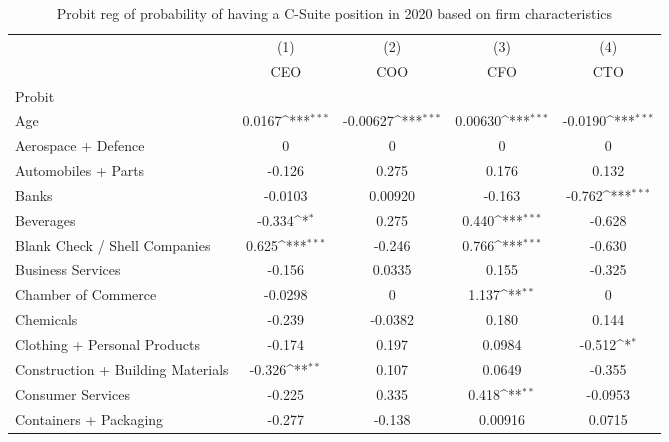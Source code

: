 {
\def\sym#1{\ifmmode^{#1}\else\(^{#1}\)\fi}
\begin{longtable}{l*{4}{c}}
\caption{Probit reg of probability of having a C-Suite position in 2020 based on firm characteristics\label{tab1}}\\
\toprule\endfirsthead\midrule\endhead\midrule\endfoot\endlastfoot
                &\multicolumn{1}{c}{(1)}&\multicolumn{1}{c}{(2)}&\multicolumn{1}{c}{(3)}&\multicolumn{1}{c}{(4)}\\
                &\multicolumn{1}{c}{CEO}&\multicolumn{1}{c}{COO}&\multicolumn{1}{c}{CFO}&\multicolumn{1}{c}{CTO}\\
\midrule
Probit          &                  &                  &                  &                  \\
Age             &   0.0167\sym{***}& -0.00627\sym{***}&  0.00630\sym{***}&  -0.0190\sym{***}\\
Aerospace + Defence&        0         &        0         &        0         &        0         \\
Automobiles + Parts&   -0.126         &    0.275         &    0.176         &    0.132         \\
Banks           &  -0.0103         &  0.00920         &   -0.163         &   -0.762\sym{***}\\
Beverages       &   -0.334\sym{*}  &    0.275         &    0.440\sym{***}&   -0.628         \\
Blank Check / Shell Companies&    0.625\sym{***}&   -0.246         &    0.766\sym{***}&   -0.630         \\
Business Services&   -0.156         &   0.0335         &    0.155         &   -0.325         \\
Chamber of Commerce&  -0.0298         &        0         &    1.137\sym{**} &        0         \\
Chemicals       &   -0.239         &  -0.0382         &    0.180         &    0.144         \\
Clothing + Personal Products&   -0.174         &    0.197         &   0.0984         &   -0.512\sym{*}  \\
Construction + Building Materials&   -0.326\sym{**} &    0.107         &   0.0649         &   -0.355         \\
Consumer Services&   -0.225         &    0.335         &    0.418\sym{**} &  -0.0953         \\
Containers + Packaging&   -0.277         &   -0.138         &  0.00916         &   0.0715         \\

\end{longtable}}
